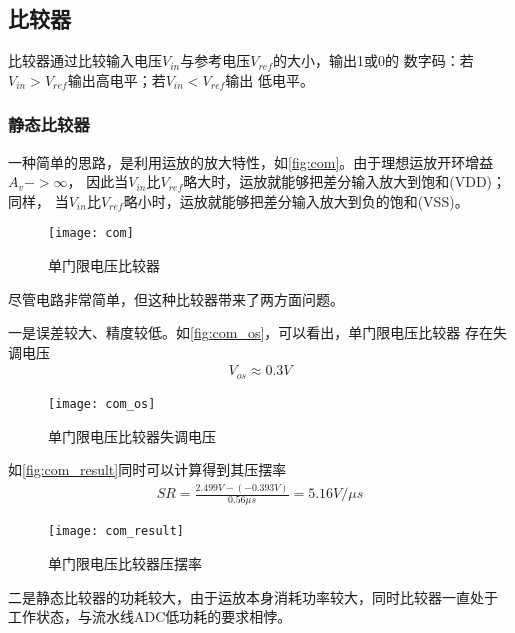 \subsection{比较器}
比较器通过比较输入电压$ V_{in} $与参考电压$ V_{ref} $的大小，输出1或0的
数字码：若$ V_{in} > V_{ref} $输出高电平；若$ V_{in} < V_{ref} $输出
低电平。
    \subsubsection{静态比较器}
    \par 一种简单的思路，是利用运放的放大特性，如\autoref{fig:com}。由于理想运放开环增益$ A_v -> \infty $，
    因此当$ V_{in} $比$ V_{ref} $略大时，运放就能够把差分输入放大到饱和(VDD)；同样，
    当$ V_{in} $比$ V_{ref} $略小时，运放就能够把差分输入放大到负的饱和(VSS)。
    \begin{figure}[H]
        \centering
        \texttt{[image: com]}
        \caption{\label{fig:com}单门限电压比较器}
    \end{figure}
    \par 尽管电路非常简单，但这种比较器带来了两方面问题。
    \par 一是误差较大、精度较低。如\autoref{fig:com_os}，可以看出，单门限电压比较器
    存在失调电压
    \begin{align}
        V_{os} \approx 0.3V
    \end{align}
    \begin{figure}[H]
        \centering
        \texttt{[image: com\_os]}
        \caption{\label{fig:com_os}单门限电压比较器失调电压}
    \end{figure}

    \par 如\autoref{fig:com_result}同时可以计算得到其压摆率
    \begin{align}
        SR = \frac{2.499V-(-0.393V)}{0.56\mu s} = 5.16V/\mu s
    \end{align}
    \begin{figure}[H]
        \centering
        \texttt{[image: com\_result]}
        \caption{\label{fig:com_result}单门限电压比较器压摆率}
    \end{figure}

    \par 二是静态比较器的功耗较大，由于运放本身消耗功率较大，同时比较器一直处于
    工作状态，与流水线ADC低功耗的要求相悖。
